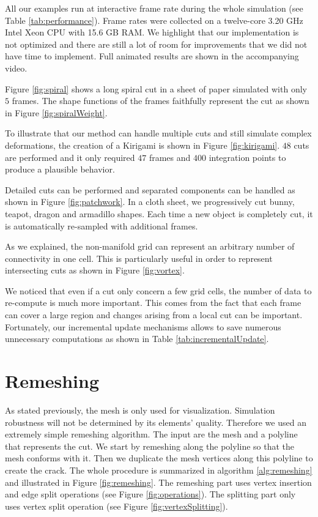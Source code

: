 All our examples run at interactive frame rate during the whole simulation (see Table \ref{tab:performance}). Frame rates were collected on a twelve-core 3.20 GHz Intel Xeon CPU with 15.6 GB RAM. We highlight that our implementation is not optimized and there are still a lot of room for improvements that we did not have time to implement. Full animated results are shown in the accompanying video.

Figure \ref{fig:spiral} shows a long spiral cut in a sheet of paper simulated with only $5$ frames. The shape functions of the frames faithfully represent the cut as shown in Figure \ref{fig:spiralWeight}. 

To illustrate that our method can handle multiple cuts and still simulate complex deformations, the creation of a Kirigami is shown in Figure \ref{fig:kirigami}. $48$ cuts are performed and it only required $47$ frames and $400$ integration points to produce a plausible behavior.

Detailed cuts can be performed and separated components can be handled as shown in Figure \ref{fig:patchwork}. In a cloth sheet, we progressively cut bunny, teapot, dragon and armadillo shapes. Each time a new object is completely cut, it is automatically re-sampled with additional frames.

As we explained, the non-manifold grid can represent an arbitrary number of connectivity in one cell. This is particularly useful in order to represent intersecting cuts as shown in Figure \ref{fig:vortex}.

We noticed that even if a cut only concern a few grid cells, the number of data to re-compute is much more important. This comes from the fact that each frame can cover a large region and changes arising from a local cut can be important. Fortunately, our incremental update mechanisms allows to save numerous unnecessary computations as shown in Table \ref{tab:incrementalUpdate}. 

\section{Remeshing} \label{appendix:remeshing}

As stated previously, the mesh is only used for visualization. Simulation robustness will not be determined by its elements' quality. Therefore we used an extremely simple remeshing algorithm. The input are the mesh and a polyline that represents the cut. We start by remeshing along the polyline so that the mesh  conforms with it. Then we duplicate the mesh vertices along this polyline to create the crack. The whole procedure is summarized in algorithm \ref{alg:remeshing} and illustrated in Figure \ref{fig:remeshing}. The remeshing part uses vertex insertion and edge split operations (see Figure \ref{fig:operations}). The splitting part only uses vertex split operation (see Figure \ref{fig:vertexSplitting}).

